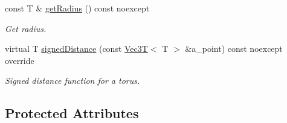 \begin{DoxyCompactItemize}
const T \& \hyperlink{classCylinderSDF_a545624c47a5a898b74059e95d44461b2}{get\+Radius} () const noexcept
\begin{DoxyCompactList}\small\item\em Get radius. \end{DoxyCompactList}\item 
virtual T \hyperlink{classCylinderSDF_a082c08089b07402d55020ed8186cc992}{signed\+Distance} (const \hyperlink{classVec3T}{Vec3T}$<$ T $>$ \&a\+\_\+point) const noexcept override
\begin{DoxyCompactList}\small\item\em Signed distance function for a torus. \end{DoxyCompactList}\end{DoxyCompactItemize}
\subsection*{Protected Attributes}
